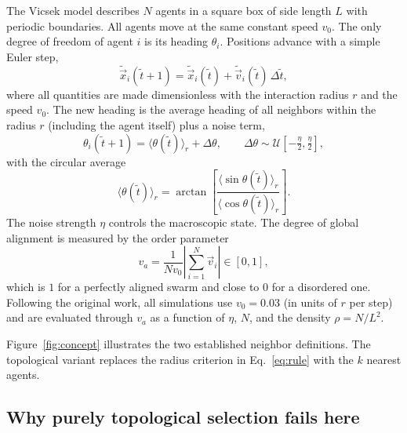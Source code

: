 \documentclass[10pt,a4paper,twocolumn]{article}
\begin{document}
The Vicsek model \cite{vicsek1995} describes $N$ agents in a square
box of side length $L$ with periodic boundaries. All agents move at
the same constant speed $v_0$. The only degree of freedom of agent
$i$ is its heading $\theta_i$. Positions advance with a simple Euler
step,
\begin{equation}
    \tilde{\vec{x}}_i(\tilde{t}+1)
    = \tilde{\vec{x}}_i(\tilde{t})
    + \tilde{\vec{v}}_i(\tilde{t}) \, \Delta\tilde{t},
    \label{eq:euler}
\end{equation}
where all quantities are made dimensionless with the interaction
radius $r$ and the speed $v_0$. The new heading is the average heading
of all neighbors within the radius $r$ (including the agent itself)
plus a noise term,
\begin{equation}
    \theta_i(\tilde{t}+1)
    = \langle\theta(\tilde{t})\rangle_r + \Delta\theta,
    \qquad
    \Delta\theta \sim \mathcal{U}\!\left[-\tfrac{\eta}{2},
    \tfrac{\eta}{2}\right],
    \label{eq:update}
\end{equation}
with the circular average
\begin{equation}
    \langle\theta(\tilde{t})\rangle_r
    = \arctan\!\left[
    \frac{\langle\sin\theta(\tilde{t})\rangle_r}
         {\langle\cos\theta(\tilde{t})\rangle_r}\right].
    \label{eq:rule}
\end{equation}
The noise strength $\eta$ controls the macroscopic state. The degree
of global alignment is measured by the order parameter
\begin{equation}
    v_a = \frac{1}{N v_0}\left|\sum_{i=1}^{N}\vec{v}_i\right|
    \in [0, 1],
    \label{eq:orderparam}
\end{equation}
which is $1$ for a perfectly aligned swarm and close to $0$ for a
disordered one. Following the original work, all simulations use
$v_0 = \num{0.03}$ (in units of $r$ per step) and are evaluated
through $v_a$ as a function of $\eta$, $N$, and the density
$\rho = N/L^2$.

Figure~\ref{fig:concept} illustrates the two established neighbor
definitions. The topological variant replaces the radius criterion in
Eq.~\eqref{eq:rule} with the $k$ nearest agents.

\subsection{Why purely topological selection fails here}
\end{document}
